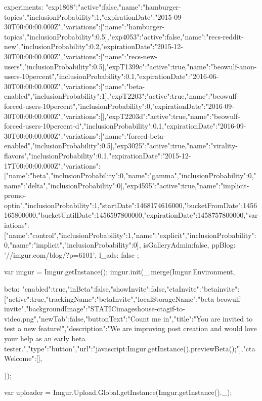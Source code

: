 {{{                experiments:   {"exp1868":{"active":false,"name":"hamburger-topics","inclusionProbability":1,"expirationDate":"2015-09-30T00:00:00.000Z","variations":[{"name":"hamburger-topics","inclusionProbability":0.5}]},"exp4053":{"active":false,"name":"recs-reddit-new","inclusionProbability":0.2,"expirationDate":"2015-12-30T00:00:00.000Z","variations":[{"name":"recs-new-users","inclusionProbability":0.5}]},"expT1399c":{"active":true,"name":"beowulf-anon-users-10percent","inclusionProbability":0.1,"expirationDate":"2016-06-30T00:00:00.000Z","variations":[{"name":"beta-enabled","inclusionProbability":1}]},"expT2203":{"active":true,"name":"beowulf-forced-users-10percent","inclusionProbability":0,"expirationDate":"2016-09-30T00:00:00.000Z","variations":[]},"expT2203d":{"active":true,"name":"beowulf-forced-users-10percent-d","inclusionProbability":0.1,"expirationDate":"2016-09-30T00:00:00.000Z","variations":[{"name":"forced-beta-enabled","inclusionProbability":0.5}]},"exp3025":{"active":true,"name":"virality-flavors","inclusionProbability":0.1,"expirationDate":"2015-12-17T00:00:00.000Z","variations":[{"name":"beta","inclusionProbability":0},{"name":"gamma","inclusionProbability":0},{"name":"delta","inclusionProbability":0}]},"exp4595":{"active":true,"name":"implicit-promo-optin","inclusionProbability":1,"startDate":1468174616000,"bucketFromDate":1456165800000,"bucketUntilDate":1456597800000,"expirationDate":1458757800000,"variations":[{"name":"control","inclusionProbability":1},{"name":"explicit","inclusionProbability":0},{"name":"implicit","inclusionProbability":0}]}},
                isGalleryAdmin:false,
                ppBlog: '//imgur.com/blog/?p=6101',
                l_ads: false
            };

            var imgur = Imgur.getInstance();
            imgur.init(_.merge(Imgur.Environment, {
                
                
                beta: {"enabled":true,"inBeta":false,"showInvite":false,"ctaInvite":{"betainvite":[{"active":true,"trackingName":"betaInvite","localStorageName":"beta-beowulf-invite","backgroundImage":"{STATIC}\/images\/house-cta\/gif-to-video.png","newTab":false,"buttonText":"Count me in","title":"You are invited to test a new feature!","description":"We are improving post creation and would love your help as an early beta tester.","type":"button","url":"javascript:Imgur.getInstance().previewBeta();"}]},"ctaWelcome":[]},
            }));

                            var uploader = Imgur.Upload.Global.getInstance(Imgur.getInstance()._);

}}
